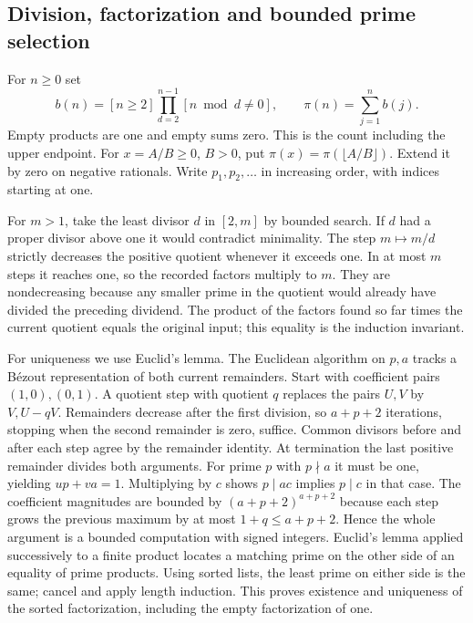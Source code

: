 \subsection{Division, factorization and bounded prime selection}

For $n\ge0$ set
\[
 b(n)=[n\ge2]\prod_{d=2}^{n-1}[n\bmod d\ne0],
 \qquad \pi(n)=\sum_{j=1}^n b(j).
\]
Empty products are one and empty sums zero. This is the count including the upper endpoint. For $x=A/B\ge0$, $B>0$, put $\pi(x)=\pi(\lfloor A/B\rfloor)$. Extend it by zero on negative rationals. Write $p_1,p_2,\ldots$ in increasing order, with indices starting at one.

For $m>1$, take the least divisor $d$ in $[2,m]$ by bounded search. If $d$ had a proper divisor above one it would contradict minimality. The step $m\mapsto m/d$ strictly decreases the positive quotient whenever it exceeds one. In at most $m$ steps it reaches one, so the recorded factors multiply to $m$. They are nondecreasing because any smaller prime in the quotient would already have divided the preceding dividend. The product of the factors found so far times the current quotient equals the original input; this equality is the induction invariant.

For uniqueness we use Euclid's lemma. The Euclidean algorithm on $p,a$ tracks a Bézout representation of both current remainders. Start with coefficient pairs $(1,0),(0,1)$. A quotient step with quotient $q$ replaces the pairs $U,V$ by $V,U-qV$. Remainders decrease after the first division, so $a+p+2$ iterations, stopping when the second remainder is zero, suffice. Common divisors before and after each step agree by the remainder identity. At termination the last positive remainder divides both arguments. For prime $p$ with $p\nmid a$ it must be one, yielding $up+va=1$. Multiplying by $c$ shows $p\mid ac$ implies $p\mid c$ in that case. The coefficient magnitudes are bounded by $(a+p+2)^{a+p+2}$ because each step grows the previous maximum by at most $1+q\le a+p+2$. Hence the whole argument is a bounded computation with signed integers. Euclid's lemma applied successively to a finite product locates a matching prime on the other side of an equality of prime products. Using sorted lists, the least prime on either side is the same; cancel and apply length induction. This proves existence and uniqueness of the sorted factorization, including the empty factorization of one.

